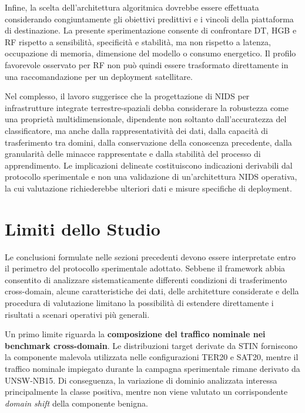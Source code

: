 Infine, la scelta dell'architettura algoritmica dovrebbe essere effettuata considerando congiuntamente gli obiettivi predittivi e i vincoli della piattaforma di destinazione.
La presente sperimentazione consente di confrontare DT, HGB e RF rispetto a sensibilità, specificità e stabilità, ma non rispetto a latenza, occupazione di memoria, dimensione del modello o consumo energetico.
Il profilo favorevole osservato per RF non può quindi essere trasformato direttamente in una raccomandazione per un deployment satellitare.

Nel complesso, il lavoro suggerisce che la progettazione di NIDS per infrastrutture integrate terrestre-spaziali debba considerare la robustezza come una proprietà multidimensionale, dipendente non soltanto dall'accuratezza del classificatore, ma anche dalla rappresentatività dei dati, dalla capacità di trasferimento tra domini, dalla conservazione della conoscenza precedente, dalla granularità delle minacce rappresentate e dalla stabilità del processo di apprendimento.
Le implicazioni delineate costituiscono indicazioni derivabili dal protocollo sperimentale e non una validazione di un'architettura NIDS operativa, la cui valutazione richiederebbe ulteriori dati e misure specifiche di deployment.




\section{Limiti dello Studio}
\label{sec:limiti_studio}

Le conclusioni formulate nelle sezioni precedenti devono essere interpretate entro il perimetro del protocollo sperimentale adottato.
Sebbene il framework abbia consentito di analizzare sistematicamente differenti condizioni di trasferimento cross-domain, alcune caratteristiche dei dati, delle architetture considerate e della procedura di valutazione limitano la possibilità di estendere direttamente i risultati a scenari operativi più generali.

Un primo limite riguarda la \textbf{composizione del traffico nominale nei benchmark cross-domain}.
Le distribuzioni target derivate da STIN forniscono la componente malevola utilizzata nelle configurazioni TER20 e SAT20, mentre il traffico nominale impiegato durante la campagna sperimentale rimane derivato da UNSW-NB15.
Di conseguenza, la variazione di dominio analizzata interessa principalmente la classe positiva, mentre non viene valutato un corrispondente \textit{domain shift} della componente benigna.

